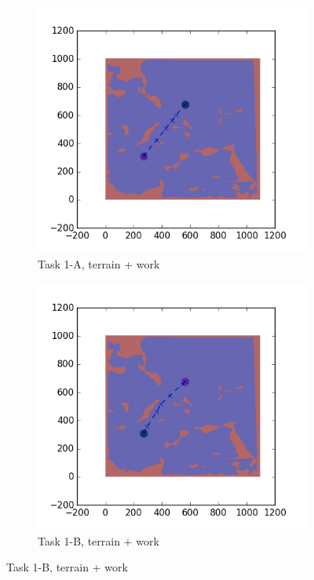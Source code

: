 \documentclass{tamuccthesis}
\begin{document}
\begin{figure}
    \begin{subfigure}[b]{0.4\textwidth}
        \centering
        \includegraphics[width=\textwidth,trim={3cm 3cm 3cm 3cm},clip]{EXP3RG_PathAa_-1_-1_-1_0.png}
        \caption{{\small Task 1-A, terrain + work}}    
        \label{fig:Path_1-A_terrain_work}
    \end{subfigure}
    \hfill
    \begin{subfigure}[b]{0.4\textwidth}  
        \centering 
        \includegraphics[width=\textwidth,trim={3cm 3cm 3cm 3cm},clip]{EXP3RG_PathAb_-1_-1_-1_0.png}
        \caption{{\small Task 1-B, terrain + work}}   
        \label{fig:Path_1-B_terrain_work}
    \end{subfigure}


\end{figure}
\end{document}
